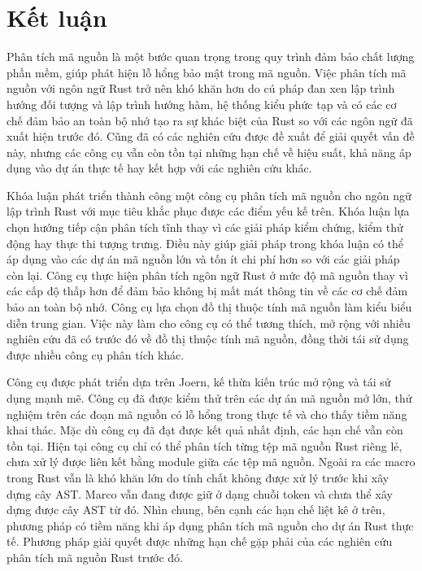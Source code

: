 \chapter*{Kết luận}

Phân tích mã nguồn là một bước quan trọng trong quy trình đảm bảo chất lượng phần mềm, giúp phát hiện lỗ hổng bảo mật trong mã nguồn.
Việc phân tích mã nguồn với ngôn ngữ Rust trở nên khó khăn hơn do cú pháp đan xen lập trình hướng đối tượng và lập trình hướng hàm, hệ thống kiểu  phức tạp và có các cơ chế đảm bảo an toàn bộ nhớ tạo ra sự khác biệt của Rust so với các ngôn ngữ đã xuất hiện trước đó.
Cũng đã có các nghiên cứu được đề xuất để giải quyết vấn đề này, nhưng các công cụ vẫn còn tồn tại những hạn chế về hiệu suất, khả năng áp dụng vào dự án thực tế hay kết hợp với các nghiên cứu khác.

Khóa luận phát triển thành công một công cụ phân tích mã nguồn cho ngôn ngữ lập trình Rust với mục tiêu khắc phục được các điểm yếu kế trên.
Khóa luận lựa chọn hướng tiếp cận phân tích tĩnh thay vì các giải pháp kiểm chứng, kiểm thử động hay thực thi tượng trưng.
Điều này giúp giải pháp trong khóa luận có thể áp dụng vào các dự án mã nguồn lớn và tốn ít chi phí hơn so với các giải pháp còn lại.
Công cụ thực hiện phân tích ngôn ngữ Rust ở mức độ mã nguồn thay vì các cấp độ thấp hơn để đảm bảo không bị mất mát thông tin về các cơ chế đảm bảo an toàn bộ nhớ.
Công cụ lựa chọn đồ thị thuộc tính mã nguồn làm kiểu biểu diễn trung gian.
Việc này làm cho công cụ có thể tương thích, mở rộng với nhiều nghiên cứu đã có trước đó về đồ thị thuộc tính mã nguồn, đồng thời tái sử dụng được nhiều công cụ phân tích khác.

Công cụ được phát triển dựa trên Joern, kế thừa kiến trúc mở rộng và tái sử dụng mạnh mẽ.
Công cụ đã được kiểm thử trên các dự án mã nguồn mở lớn, thử nghiệm trên các đoạn mã nguồn có lỗ hổng trong thực tế và cho thấy tiềm năng khai thác.
Mặc dù công cụ đã đạt được kết quả nhất định, các hạn chế vẫn còn tồn tại.
Hiện tại công cụ chỉ có thể phân tích từng tệp mã nguồn Rust riêng lẻ, chưa xử lý được liên kết bằng module giữa các tệp mã nguồn.
Ngoài ra các macro trong Rust vẫn là khó khăn lớn do tính chất không được xử lý trước khi xây dựng cây AST.
Marco vẫn đang được giữ ở dạng chuỗi token và chưa thể xây dựng được cây AST từ đó.
Nhìn chung, bên cạnh các hạn chế liệt kê ở trên, phương pháp có tiềm năng khi áp dụng phân tích mã nguồn cho dự án Rust thực tế.
Phương pháp giải quyết được những hạn chế gặp phải của các nghiên cứu phân tích mã nguồn Rust trước đó.
